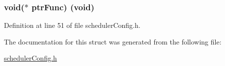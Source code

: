 \subsubsection[{ptr\+Func}]{\setlength{\rightskip}{0pt plus 5cm}void($\ast$ ptr\+Func) (void)}\label{struct_task_type__st_type_a86cfdbe6606dca2bdfa7ff9b37e9f9be}


Definition at line 51 of file scheduler\+Config.\+h.



The documentation for this struct was generated from the following file\+:\begin{DoxyCompactItemize}
\item 
\hyperlink{scheduler_config_8h}{scheduler\+Config.\+h}\end{DoxyCompactItemize}
